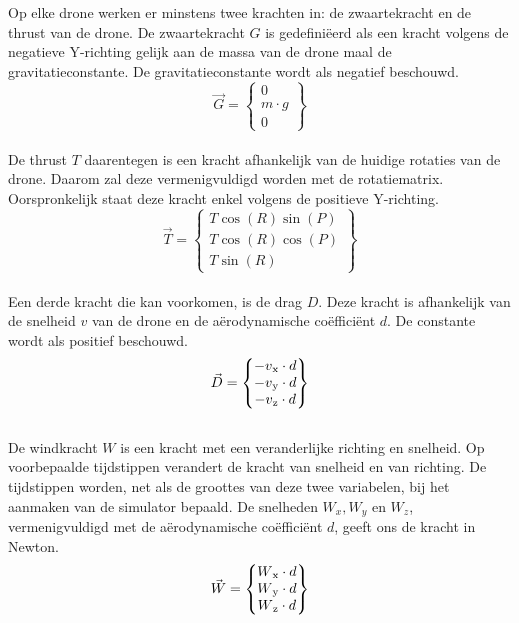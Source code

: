 \\
\\
Op elke drone werken er minstens twee krachten in: de zwaartekracht en de thrust van de drone. De zwaartekracht \(G\) is gedefiniëerd als een kracht volgens de negatieve Y-richting gelijk aan de massa van de drone maal de gravitatieconstante. De gravitatieconstante wordt als negatief beschouwd.
\begin{equation*}
\vec{G} = 
\begin{Bmatrix}
0 \\
m \cdot g \\
0
\end{Bmatrix} \label{zwaartekracht}
\end{equation*}
\\
De thrust \(T\) daarentegen is een kracht afhankelijk van de huidige rotaties van de drone. Daarom zal deze vermenigvuldigd worden met de rotatiematrix. Oorspronkelijk staat deze kracht enkel volgens de positieve Y-richting. 
\\
\begin{equation*}
\vec{T} =
\begin{Bmatrix}
T \cos(R) \sin(P) \\
T \cos(R)\cos(P)\\
T \sin(R)
\end{Bmatrix} \label{thrustkracht}
\end{equation*}
\\
Een derde kracht die kan voorkomen, is de drag \(D\). Deze kracht is afhankelijk van de snelheid \(v\) van de drone en de a\"erodynamische coëfficiënt \(d\). De constante wordt als positief beschouwd.
\begin{equation*}
\vec{D} =
\begin{Bmatrix}
-v\textsubscript{x} \cdot d \\
-v\textsubscript{y} \cdot d \\
-v\textsubscript{z} \cdot d 
\end{Bmatrix} \label{dragkracht}
\end{equation*}
\\
De windkracht \(W\) is een kracht met een veranderlijke richting en snelheid. Op voorbepaalde tijdstippen verandert de kracht van snelheid en van richting. De tijdstippen worden, net als de groottes van deze twee variabelen, bij het aanmaken van de simulator bepaald. De snelheden \(W_x, W_y\) en \(W_z\), vermenigvuldigd met de a\"erodynamische coëfficiënt \(d\), geeft ons de kracht in Newton. 
\begin{equation*}
\vec{W} = 
\begin{Bmatrix}
W\textsubscript{x} \cdot d \\
W\textsubscript{y} \cdot d \\
W\textsubscript{z} \cdot d 
\end{Bmatrix} \label{windkracht}
\end{equation*}
